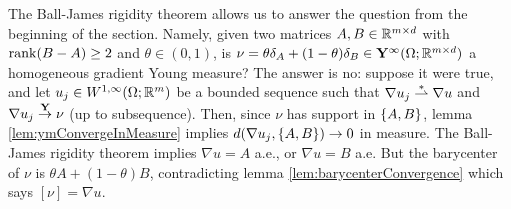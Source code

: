 The Ball-James rigidity theorem allows us to answer the question from the beginning of the section. Namely, given two matrices $A,B \in \mathbb{R}^{m \times d}$ with $\operatorname{\mathrm{rank}}(B - A) \geq 2$ and $\theta \in (0,1)$, is $\nu = \theta \delta_A + (1-\theta) \delta_B \in \mathbf{Y}^\infty(\Omega;\mathbb{R}^{m \times d})$ a homogeneous gradient Young measure? The answer is no: suppose it were true, and let $u_j \in W^{1,\infty}(\Omega;\mathbb{R}^m)$ be a bounded sequence such that $\nabla u_j \overset{\ast}{\rightharpoonup} \nabla u$ and $\nabla u_j \overset{\mathbf{Y}}{\rightarrow} \nu$ (up to subsequence). Then, since $\nu$ has support in $\left\{ {A,B} \right\}$, lemma \ref{lem:ymConvergeInMeasure} implies $d(\nabla u_j, \left\{ {A,B} \right\}) \to 0$ in measure. The Ball-James rigidity theorem implies $\nabla u = A$ a.e., or $\nabla u = B$ a.e. But the barycenter of $\nu$ is $\theta A + (1-\theta) B$, contradicting lemma \ref{lem:barycenterConvergence} which says $[\nu] = \nabla u$.
